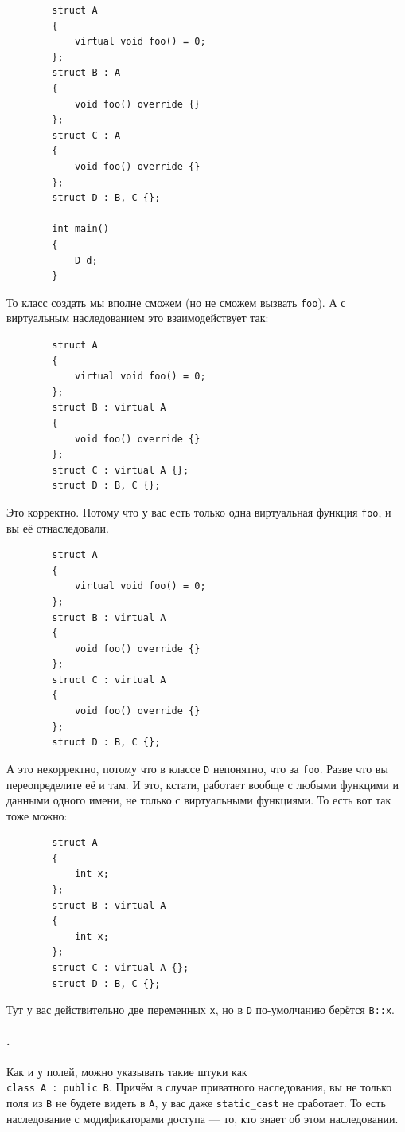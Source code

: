 \documentclass{article}
\begin{document}
    \begin{verbatim}
        struct A
        {
            virtual void foo() = 0;
        };
        struct B : A
        {
            void foo() override {}
        };
        struct C : A
        {
            void foo() override {}
        };
        struct D : B, C {};
        
        int main()
        {
            D d;
        }
    \end{verbatim}
    То класс создать мы вполне сможем (но не сможем вызвать \texttt{foo}). А с виртуальным наследованием это взаимодействует так:
    \begin{verbatim}
        struct A
        {
            virtual void foo() = 0;
        };
        struct B : virtual A
        {
            void foo() override {}
        };
        struct C : virtual A {};
        struct D : B, C {};
    \end{verbatim}
    Это корректно. Потому что у вас есть только одна виртуальная функция \texttt{foo}, и вы её отнаследовали.
    \begin{verbatim}
        struct A
        {
            virtual void foo() = 0;
        };
        struct B : virtual A
        {
            void foo() override {}
        };
        struct C : virtual A
        {
            void foo() override {}
        };
        struct D : B, C {};
    \end{verbatim}
    А это некорректно, потому что в классе \texttt{D} непонятно, что за \texttt{foo}. Разве что вы переопределите её и там. И это, кстати, работает вообще с любыми функцими и данными одного имени, не только с виртуальными функциями. То есть вот так тоже можно:
    \begin{verbatim}
        struct A
        {
            int x;
        };
        struct B : virtual A
        {
            int x;
        };
        struct C : virtual A {};
        struct D : B, C {};
    \end{verbatim}
    Тут у вас действительно две переменных \texttt{x}, но в \texttt{D} по-умолчанию берётся \texttt{B::x}.
    \paragraph{.}
    Как и у полей, можно указывать такие штуки как\\\texttt{class A : public B}. Причём в случае приватного наследования, вы не только поля из \texttt{B} не будете видеть в \texttt{A}, у вас даже \texttt{static_cast} не сработает. То есть наследование с модификаторами доступа --- то, кто знает об этом наследовании.
\end{document}
